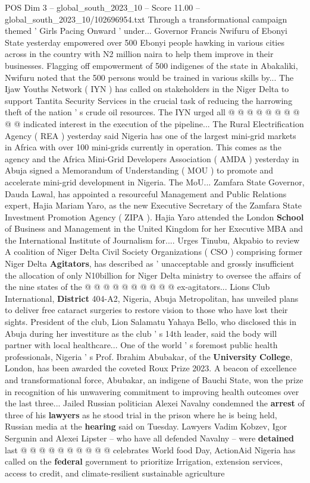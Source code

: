 \begin{textsample}{POS Dim 3 – global\_south\_2023\_10 – Score 11.00 – global\_south\_2023\_10/102696954.txt}
Through a transformational campaign themed ' Girls Pacing Onward ' under...
Governor Francis Nwifuru of Ebonyi State yesterday empowered over 500 Ebonyi people hawking in various cities across in the country with N2 million naira to help them improve in their businesses.
Flagging off empowerment of 500 indigenes of the state in Abakaliki, Nwifuru noted that the 500 persons would be trained in various skills by...
The Ijaw Youths Network ( IYN ) has called on stakeholders in the Niger Delta to support Tantita Security Services in the crucial task of reducing the harrowing theft of the nation ' s crude oil resources.
The IYN urged all @ @ @ @ @ @ @ @ @ @ indicated interest in the execution of the pipeline...
The Rural Electrification Agency ( REA ) yesterday said Nigeria has one of the largest mini-grid markets in Africa with over 100 mini-grids currently in operation.
This comes as the agency and the Africa Mini-Grid Developers Association ( AMDA ) yesterday in Abuja signed a Memorandum of Understanding ( MOU ) to promote and accelerate mini-grid development in Nigeria.
The MoU...
Zamfara State Governor, Dauda Lawal, has appointed a resourceful Management and Public Relations expert, Hajia Mariam Yaro, as the new Executive Secretary of the Zamfara State Investment Promotion Agency ( ZIPA ).
Hajia Yaro attended the London \textbf{School} of Business and Management in the United Kingdom for her Executive MBA and the International Institute of Journalism for....
Urges Tinubu, Akpabio to review A coalition of Niger Delta Civil Society Organizations ( CSO ) comprising former Niger Delta \textbf{Agitators}, has described as ' unacceptable and grossly insufficient the allocation of only N10billion for Niger Delta ministry to oversee the affairs of the nine states of the @ @ @ @ @ @ @ @ @ @ ex-agitators...
Lions Club International, \textbf{District} 404-A2, Nigeria, Abuja Metropolitan, has unveiled plans to deliver free cataract surgeries to restore vision to those who have lost their sights.
President of the club, Lion Salamatu Yahaya Bello, who disclosed this in Abuja during her investiture as the club ' s 14th leader, said the body will partner with local healthcare...
One of the world ' s foremost public health professionals, Nigeria ' s Prof.
Ibrahim Abubakar, of the \textbf{University} \textbf{College}, London, has been awarded the coveted Roux Prize 2023.
A beacon of excellence and transformational force, Abubakar, an indigene of Bauchi State, won the prize in recognition of his unwavering commitment to improving health outcomes over the last three...
Jailed Russian politician Alexei Navalny condemned the \textbf{arrest} of three of his \textbf{lawyers} as he stood trial in the prison where he is being held, Russian media at the \textbf{hearing} said on Tuesday.
Lawyers Vadim Kobzev, Igor Sergunin and Alexei Lipster -- who have all defended Navalny -- were \textbf{detained} last @ @ @ @ @ @ @ @ @ @ celebrates World food Day, ActionAid Nigeria has called on the \textbf{federal} government to prioritize Irrigation, extension services, access to credit, and climate-resilient sustainable agriculture


\end{textsample}
